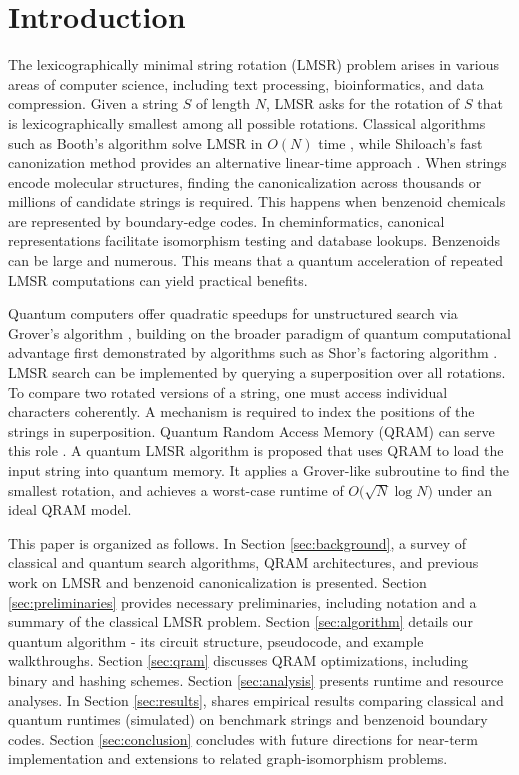 \documentclass[11pt,letterpaper]{article}
\begin{document}
\section{Introduction}
The lexicographically minimal string rotation (LMSR) problem arises in various areas of computer science, including text processing, bioinformatics, and data compression. Given a string \(S\) of length \(N\), LMSR asks for the rotation of \(S\) that is lexicographically smallest among all possible rotations. Classical algorithms such as Booth's algorithm solve LMSR in \(O(N)\) time \cite{booth1980lexicographically}, while Shiloach's fast canonization method provides an alternative linear-time approach \cite{shiloach1981fast}. When strings encode molecular structures, finding the canonicalization across thousands or millions of candidate strings is required. This happens when benzenoid chemicals are represented by boundary-edge codes. In cheminformatics, canonical representations facilitate isomorphism testing and database lookups. Benzenoids can be large and numerous. This means that a quantum acceleration of repeated LMSR computations can yield practical benefits.

Quantum computers offer quadratic speedups for unstructured search via Grover's algorithm \cite{grover1996fast,boyer1998tight}, building on the broader paradigm of quantum computational advantage first demonstrated by algorithms such as Shor's factoring algorithm \cite{shor1994algorithms}. LMSR search can be implemented by querying a superposition over all rotations. To compare two rotated versions of a string, one must access individual characters coherently. A mechanism is required to index the positions of the strings in superposition. Quantum Random Access Memory (QRAM) can serve this role \cite{giovannetti2008quantum}. A quantum LMSR algorithm is proposed that uses QRAM to load the input string into quantum memory. It applies a Grover-like subroutine to find the smallest rotation, and achieves a worst-case runtime of \(O\bigl(\sqrt{N}\log N\bigr)\) under an ideal QRAM model.

This paper is organized as follows. In Section \ref{sec:background}, a survey of classical and quantum search algorithms, QRAM architectures, and previous work on LMSR and benzenoid canonicalization is presented. Section \ref{sec:preliminaries} provides necessary preliminaries, including notation and a summary of the classical LMSR problem. Section \ref{sec:algorithm} details our quantum algorithm - its circuit structure, pseudocode, and example walkthroughs. Section \ref{sec:qram} discusses QRAM optimizations, including binary and hashing schemes. Section \ref{sec:analysis} presents runtime and resource analyses. In Section \ref{sec:results}, shares empirical results comparing classical and quantum runtimes (simulated) on benchmark strings and benzenoid boundary codes. Section \ref{sec:conclusion} concludes with future directions for near-term implementation and extensions to related graph-isomorphism problems.
\end{document}
